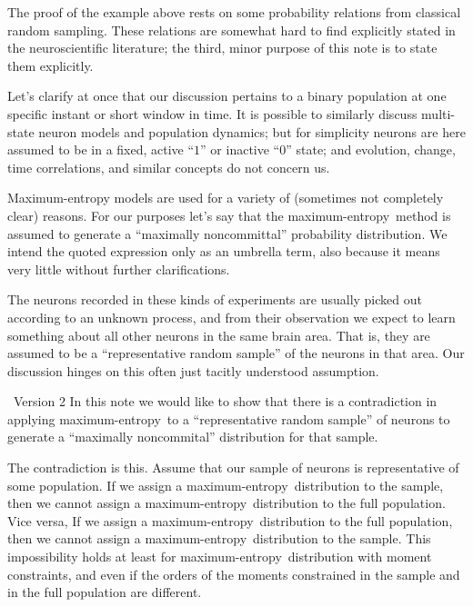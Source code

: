 \documentclass{article}
\theoremstyle{remark}
\theoremstyle{innote}
\newcommand*{\citep}{\parencites}
\renewcommand*{\cite}{\citep}
\renewcommand*{\|}{\mathpunct{|}}%
\theoremstyle{simple}
\newcommand*{\puzzle}{{\fontencoding{U}\fontfamily{fontawesometwo}\selectfont\symbol{225}}}
\newcommand{\mynote}[1]{ {\color{notecolour}\puzzle\ #1}}
\newcommand*{\me}{maximum-entropy}
\begin{document}
The proof of the example above rests on some probability relations from
classical random sampling. These relations are somewhat hard to find
explicitly stated in the neuroscientific literature; the third, minor
purpose of this note is to state them explicitly.


Let's clarify at once that our discussion pertains to a binary population at
one specific instant or short window in time. It is possible to
similarly discuss multi-state neuron models and population dynamics; but for
simplicity neurons are here assumed to be in a fixed, active \enquote{$1$}
or inactive \enquote{$0$} state; and evolution, change, time correlations,
and similar concepts do not concern us.


Maximum-entropy models are used for a variety of (sometimes not completely
clear) reasons. For our purposes let's say that the \me\ method is assumed
to generate a \enquote{maximally noncommittal} \cite{jaynes1963} probability
distribution. We intend the quoted expression only as an umbrella term,
also because it means very little without further clarifications.

The neurons recorded in these kinds of experiments are usually picked out
according to an unknown process, and from their observation we expect to
learn something about all other neurons in the same brain area. That is,
they are assumed to be a \enquote{representative random sample} of the
neurons in that area. Our discussion hinges on this often just tacitly
understood assumption.


\mynote{Version 2 }
In this note we would like to show that there is a
contradiction in applying \me\ to a \enquote{representative random sample}
of neurons to generate a \enquote{maximally noncommital} distribution for
that sample.

The contradiction is this. Assume that our sample of neurons is
representative of some population. If we assign a \me\ distribution to the
sample, then we cannot assign a \me\ distribution to the full population.
Vice versa, If we assign a \me\ distribution to the full population, then
we cannot assign a \me\ distribution to the sample. This impossibility
holds at least for \me\ distribution with moment constraints, and even if
the orders of the moments constrained in the sample and in the full
population are different.
\end{document}

